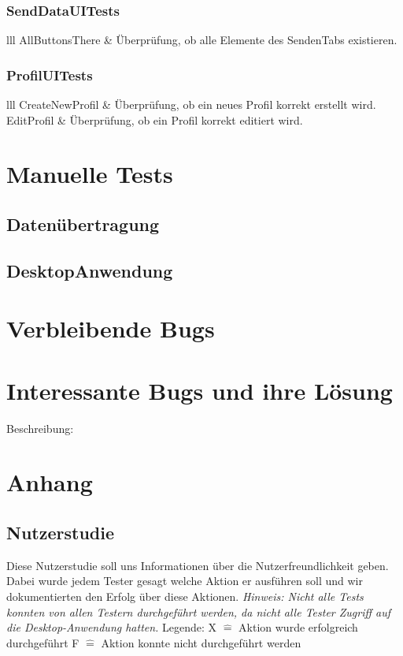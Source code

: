 \documentclass[a4paper]{scrreprt}
\begin{document}
\subsection{SendDataUITests}
\begin{tabular}{lll}
{AllButtonsThere} &   {Überprüfung, ob alle Elemente des SendenTabs existieren.} \\
\end{tabular}
\subsection{ProfilUITests}
\begin{tabular}{lll}
{CreateNewProfil} &   {Überprüfung, ob ein neues Profil korrekt erstellt wird.} \\
{EditProfil} &   {Überprüfung, ob ein Profil korrekt editiert wird.} \\
\end{tabular}
\chapter{Manuelle Tests}
\section{Datenübertragung}
\section{DesktopAnwendung}
\chapter{Verbleibende Bugs}
\chapter{Interessante Bugs und ihre Lösung}
Beschreibung: 
\chapter{Anhang}
\section{Nutzerstudie}
Diese Nutzerstudie soll uns Informationen über die Nutzerfreundlichkeit geben. Dabei wurde jedem Tester gesagt welche Aktion er ausführen soll und wir dokumentierten den Erfolg über diese Aktionen.
\textit{Hinweis: Nicht alle Tests konnten von allen Testern durchgeführt werden, da nicht alle Tester Zugriff auf die Desktop-Anwendung hatten.} \newline
Legende: \newline
X $\widehat{=}$ Aktion wurde erfolgreich durchgeführt \newline
F $\widehat{=}$ Aktion konnte nicht durchgeführt werden \newline
\end{document}

